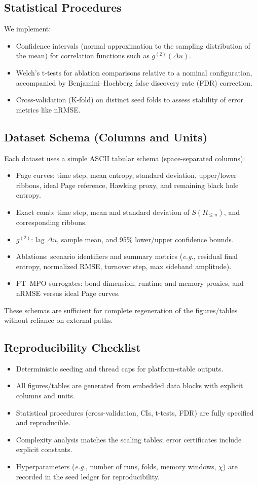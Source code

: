 \documentclass[11pt,a4paper]{article}
\newcommand{\eg}{\textit{e.g.}\xspace}
\theoremstyle{plain}
\theoremstyle{definition}
\theoremstyle{remark}
\begin{document}
\subsection{Statistical Procedures}
We implement:
\begin{itemize}
  \item Confidence intervals (normal approximation to the sampling distribution of the mean) for correlation functions such as $g^{(2)}(\Delta u)$.
  \item Welch's t-tests for ablation comparisons relative to a nominal configuration, accompanied by Benjamini--Hochberg false discovery rate (FDR) correction.
  \item Cross-validation (K-fold) on distinct seed folds to assess stability of error metrics like nRMSE.
\end{itemize}

\subsection{Dataset Schema (Columns and Units)}
Each dataset uses a simple ASCII tabular schema (space-separated columns):
\begin{itemize}
  \item Page curves: time step, mean entropy, standard deviation, upper/lower ribbons, ideal Page reference, Hawking proxy, and remaining black hole entropy.
  \item Exact comb: time step, mean and standard deviation of $S(R_{\le n})$, and corresponding ribbons.
  \item $g^{(2)}$: lag $\Delta u$, sample mean, and 95\% lower/upper confidence bounds.
  \item Ablations: scenario identifiers and summary metrics (\eg, residual final entropy, normalized RMSE, turnover step, max sideband amplitude).
  \item PT--MPO surrogates: bond dimension, runtime and memory proxies, and nRMSE versus ideal Page curves.
\end{itemize}
These schemas are sufficient for complete regeneration of the figures/tables without reliance on external paths.

\subsection{Reproducibility Checklist}
\begin{itemize}
  \item Deterministic seeding and thread caps for platform-stable outputs.
  \item All figures/tables are generated from embedded data blocks with explicit columns and units.
  \item Statistical procedures (cross-validation, CIs, t-tests, FDR) are fully specified and reproducible.
  \item Complexity analysis matches the scaling tables; error certificates include explicit constants.
  \item Hyperparameters (\eg, number of runs, folds, memory windows, $\chi$) are recorded in the seed ledger for reproducibility.
\end{itemize}
\end{document}

